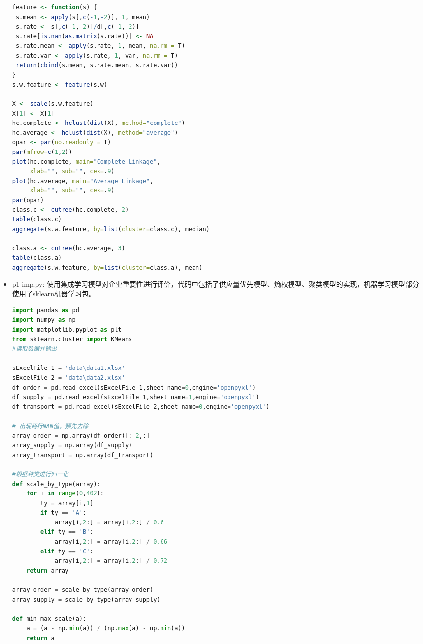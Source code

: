 \documentclass{my_paper}
\begin{document}
\begin{itemize}
\begin{lstlisting}[language=R]
feature <- function(s) {
 s.mean <- apply(s[,c(-1,-2)], 1, mean)
 s.rate <- s[,c(-1,-2)]/d[,c(-1,-2)]
 s.rate[is.nan(as.matrix(s.rate))] <- NA
 s.rate.mean <- apply(s.rate, 1, mean, na.rm = T)
 s.rate.var <- apply(s.rate, 1, var, na.rm = T)
 return(cbind(s.mean, s.rate.mean, s.rate.var))
}
s.w.feature <- feature(s.w)

X <- scale(s.w.feature)
X[1] <- X[1]
hc.complete <- hclust(dist(X), method="complete")
hc.average <- hclust(dist(X), method="average")
opar <- par(no.readonly = T)
par(mfrow=c(1,2))
plot(hc.complete, main="Complete Linkage", 
     xlab="", sub="", cex=.9)
plot(hc.average, main="Average Linkage", 
     xlab="", sub="", cex=.9)
par(opar)
class.c <- cutree(hc.complete, 2)
table(class.c)
aggregate(s.w.feature, by=list(cluster=class.c), median)

class.a <- cutree(hc.average, 3)
table(class.a)
aggregate(s.w.feature, by=list(cluster=class.a), mean)

\end{lstlisting}

\item p1-imp.py: 使用集成学习模型对企业重要性进行评价，代码中包括了供应量优先模型、熵权模型、聚类模型的实现，机器学习模型部分使用了sklearn机器学习包。

\begin{lstlisting}[language={Python}]
import pandas as pd 
import numpy as np
import matplotlib.pyplot as plt 
from sklearn.cluster import KMeans
#读取数据并输出

sExcelFile_1 = 'data\data1.xlsx'
sExcelFile_2 = 'data\data2.xlsx'
df_order = pd.read_excel(sExcelFile_1,sheet_name=0,engine='openpyxl')
df_supply = pd.read_excel(sExcelFile_1,sheet_name=1,engine='openpyxl')
df_transport = pd.read_excel(sExcelFile_2,sheet_name=0,engine='openpyxl')

# 出现两行NAN值，预先去除
array_order = np.array(df_order)[:-2,:]
array_supply = np.array(df_supply)
array_transport = np.array(df_transport)

#根据种类进行归一化
def scale_by_type(array):
    for i in range(0,402):
        ty = array[i,1]
        if ty == 'A':
            array[i,2:] = array[i,2:] / 0.6
        elif ty == 'B':
            array[i,2:] = array[i,2:] / 0.66
        elif ty == 'C':
            array[i,2:] = array[i,2:] / 0.72
    return array

array_order = scale_by_type(array_order)
array_supply = scale_by_type(array_supply)

def min_max_scale(a):
    a = (a - np.min(a)) / (np.max(a) - np.min(a))
    return a 


\end{lstlisting}
\end{itemize}
\end{document}
